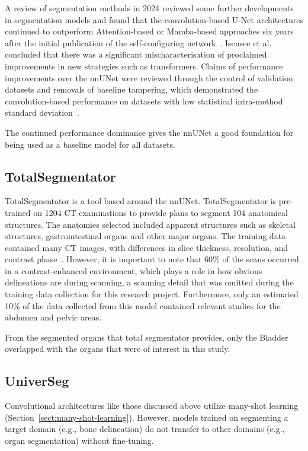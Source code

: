 \documentclass[11pt,twoside]{report}
\begin{document}
A review of segmentation methods in 2024 reviewed some further developments in segmentation models and found that the convolution-based U-Net architectures continued to outperform Attention-based or Mamba-based approaches six years after the initial publication of the self-configuring network~\cite{isensee2024nnunet}. Isensee et al. concluded that there was a significant mischaracterisation of proclaimed improvements in new strategies such as transformers. Claims of performance improvements over the nnUNet were reviewed through the control of validation datasets and removals of baseline tampering, which demonstrated the convolution-based performance on datasets with low statistical intra-method standard deviation~\cite{isensee2024nnunet}.

The continued performance dominance gives the nnUNet a good foundation for being used as a baseline model for all datasets.

\subsection{TotalSegmentator}

TotalSegmentator is a tool based around the nnUNet. TotalSegmentator is pre-trained on 1204 CT examinations to provide plans to segment 104 anatomical structures. The anatomies selected included apparent structures such as skeletal structures, gastrointestinal organs and other major organs. The training data contained many CT images, with differences in slice thickness, resolution, and contrast phase~\cite{totalsegmentor-paper}. However, it is important to note that 60\% of the scans occurred in a contrast-enhanced environment, which plays a role in how obvious delineations are during scanning, a scanning detail that was omitted during the training data collection for this research project. Furthermore, only an estimated 10\% of the data collected from this model contained relevant studies for the abdomen and pelvic areas.

From the segmented organs that total segmentator provides, only the Bladder overlapped with the organs that were of interest in this study.

\subsection{UniverSeg}\label{sect:universeg}

Convolutional architectures like those discussed above utilize many-shot learning (Section~\ref{sect:many-shot-learning}). However, models trained on segmenting a target domain (e.g., bone delineation) do not transfer to other domains (e.g., organ segmentation) without fine-tuning.
\end{document}
